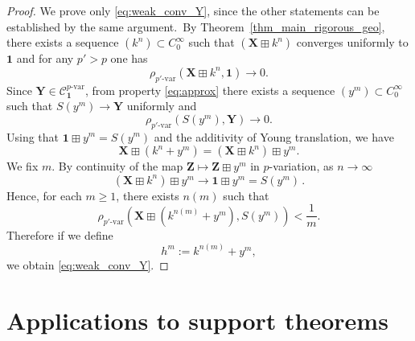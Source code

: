 \documentclass[12pt,a4paper]{article}
\numberwithin{equation}{section}
\theoremstyle{plain}
\theoremstyle{definition}
\theoremstyle{remark}
\begin{document}
\begin{proof}
We prove only \eqref{eq:weak_conv_Y}, since the other statements can be established by the same argument.\ By Theorem~\ref{thm_main_rigorous_geo}, there exists a sequence $(k^n)\subset  C^{\infty}_0$ such that $(\mathbf X\boxplus k^n)$ converges uniformly to $\mathbf{1}$ and for any $p'>p$ one has
\[
\rho_{p'\text{-var}}(\mathbf{X} \boxplus k^n, \mathbf{1}) \to 0.
\]
Since $\mathbf{Y} \in \mathcal{C}^{p\text{-var}}_{\mathbf{1}}$, from property \eqref{eq:approx} there exists a sequence $(y^m)\subset  C^{\infty}_0$ such that $S(y^m)\to \mathbf{Y}$ uniformly and
\[
\rho_{p'\text{-var}}(S(y^m), \mathbf{Y}) \to 0.
\]
Using that $\mathbf{1} \boxplus y^m = S(y^m)$ and the additivity of Young translation, we have
\[
\mathbf{X} \boxplus (k^n + y^m)
=
(\mathbf{X} \boxplus k^n) \boxplus y^m.
\]
We fix $m$. By continuity of the map $\mathbf{Z} \mapsto \mathbf{Z} \boxplus y^m$ in $p$-variation, as $n \to \infty$
\[
(\mathbf{X} \boxplus k^n) \boxplus y^m \to \mathbf{1} \boxplus y^m = S(y^m)\,.
\]
Hence, for each $m\geq 1$, there exists $n(m)$ such that
\[
\rho_{p'\text{-var}}(\mathbf{X} \boxplus (k^{n(m)} + y^m), S(y^m)) < \frac{1}{m}.
\]
Therefore if we define
\[
h^m := k^{n(m)} + y^m,
\]
we obtain \eqref{eq:weak_conv_Y}.
\end{proof}



\section{Applications to support theorems}\label{sec:4}
\end{document}
